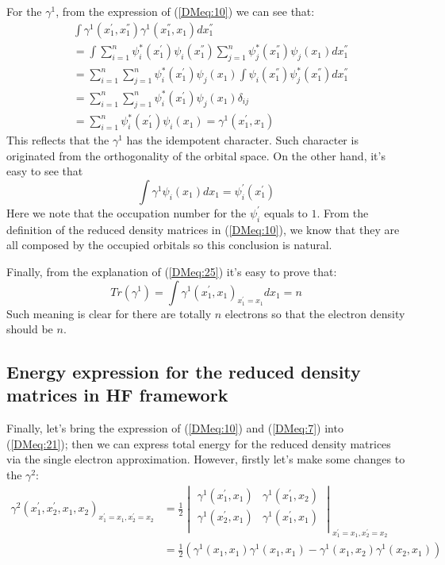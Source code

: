 For the $\gamma^{1}$, from the expression of (\ref{DMeq:10}) we can
see that:
\begin{align}\label{DMeq:23}
&\int\gamma^{1}(x^{'}_{1},x^{''}_{1})
\gamma^{1}(x^{''}_{1},x_{1})dx^{''}_{1} \nonumber
\\
&=\int \sum_{i=1}^{n}\psi^{*}_{i}(x^{'}_{1})\psi_{i}(x^{''}_{1})
\sum_{j=1}^{n}\psi^{*}_{j}(x^{''}_{1})\psi_{j}(x_{1})dx^{''}_{1}
\nonumber
\\
&=\sum_{i=1}^{n}\sum_{j=1}^{n}
\psi^{*}_{i}(x^{'}_{1})\psi_{j}(x_{1})
\int\psi_{i}(x^{''}_{1})
\psi^{*}_{j}(x^{''}_{1})dx^{''}_{1} \nonumber
\\
&=\sum_{i=1}^{n}\sum_{j=1}^{n}
\psi^{*}_{i}(x^{'}_{1})\psi_{j}(x_{1})\delta_{ij} \nonumber \\
&=\sum_{i=1}^{n} \psi^{*}_{i}(x^{'}_{1})\psi_{i}(x_{1}) =
\gamma^{1}(x^{'}_{1},x_{1})
\end{align}
This reflects that the $\gamma^{1}$ has the idempotent character.
Such character is originated from the orthogonality of the orbital
space. On the other hand, it's easy to see that
\begin{equation}\label{DMeq:25}
  \int \gamma^{1}\psi_{i}(x_{1})dx_{1} = \psi^{'}_{i}(x^{'}_{1})
\end{equation}
Here we note that the occupation number for the $\psi^{'}_{i}$
equals to $1$. From the definition of the reduced density matrices
in (\ref{DMeq:10}), we know that they are all composed by the
occupied orbitals so this conclusion is natural.

Finally, from the explanation of (\ref{DMeq:25}) it's easy to prove
that:
\begin{equation}\label{DMeq:24}
Tr(\gamma^{1}) =
\int\gamma^{1}(x^{'}_{1},x_{1})_{x^{'}_{1}=x_{1}}dx_{1} = n
\end{equation}
Such meaning is clear for there are totally $n$ electrons so that
the electron density should be $n$.


\subsection{Energy expression for the reduced density matrices
in HF framework}\label{expression_RDM_HF_framework}
%
%
%
%
Finally, let's bring the expression of (\ref{DMeq:10}) and
(\ref{DMeq:7}) into (\ref{DMeq:21}); then we can express total
energy for the reduced density matrices via the single electron
approximation. However, firstly let's make some changes to the
$\gamma^{2}$:
\begin{align}\label{}
\gamma^{2}(x^{'}_{1}, x^{'}_{2}, x_{1}, x_{2})_{x^{'}_{1}=x_{1},
x^{'}_{2}=x_{2}} &= \frac{1}{2}
  \begin{vmatrix}
    \gamma^{1}(x^{'}_{1},x_{1}) & \gamma^{1}(x^{'}_{1},x_{2})  \\
    \gamma^{1}(x^{'}_{2},x_{1}) & \gamma^{1}(x^{'}_{1},x_{1})  \\
  \end{vmatrix}_{x^{'}_{1}=x_{1},
x^{'}_{2}=x_{2}} \nonumber \\
  &=\frac{1}{2}(\gamma^{1}(x_{1},x_{1})\gamma^{1}(x_{1},x_{1}) -
  \gamma^{1}(x_{1},x_{2})\gamma^{1}(x_{2},x_{1}))
\end{align}


